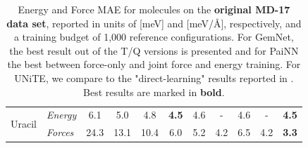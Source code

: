 \documentclass[%
reprint,
superscriptaddress,
nofootinbib,
amsmath,amssymb,
aps,
prl,
]{revtex4-1}
\begin{document}
\begin{table}[!htbp]
{\begin{tabular}{llccccccccc}
\multirow{2}{*}{Uracil}  & \textit{Energy} & 6.1 & 5.0 &4.8 &\textbf{ 4.5} & 4.6& - & 4.6&  - & \textbf{4.5} \\ 
                          & \textit{Forces} & 24.3& 13.1 &10.4 & 6.0 &5.2 & 4.2 & 6.5 & 4.2 & \textbf{3.3}\\ \hline
  \hline \hline
    \end{tabular}}
    \caption{Energy and Force MAE for molecules on the \textbf{original MD-17 data set}, reported in units of [meV] and [meV/{\AA}], respectively, and a training budget of 1,000 reference configurations. For GemNet, the best result out of the T/Q versions is presented and for PaiNN the best between force-only and joint force and energy training. For UNiTE, we compare to the "direct-learning" results reported in \cite{qiao2021unite}. Best results are marked in \textbf{bold}.}
    \label{tab:md17}
\end{table}
\end{document}
